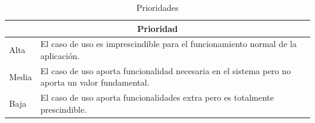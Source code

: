 \begin{table}[htpb]
\centering
\begin{tabularx}{\textwidth}{|l|X|}
\hline
\multicolumn{2}{|c|}{\textbf{Prioridad}}                                                                          \\ \hline
Alta  & El caso de uso es imprescindible para el funcionamiento normal de la aplicación.                 \\ \hline
Media & El caso de uso aporta funcionalidad necesaria en el sistema pero no aporta un valor fundamental. \\ \hline
Baja  & El caso de uso aporta funcionalidades extra pero es totalmente prescindible.                     \\ \hline
\end{tabularx}
\caption{Prioridades}
\label{tab_prior}
\end{table}

